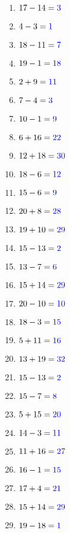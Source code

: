 \documentclass[11pt]{article}\usepackage[a4paper,margin=0.90in,tmargin=0.5in]{geometry}\usepackage{amsmath, amsthm, amssymb}
\begin{document}
\vspace{0.5\baselineskip}\begin{multicols}{4}
\begin{enumerate}[itemsep=0.45\baselineskip]
\item $17 - 14 = { \color[rgb]{0,0,1} 3 }$ 
\item $4 - 3 = { \color[rgb]{0,0,1} 1 }$ 
\item $18 - 11 = { \color[rgb]{0,0,1} 7 }$ 
\item $19 - 1 = { \color[rgb]{0,0,1} 18 }$ 
\item $2 + 9 = { \color[rgb]{0,0,1} 11 }$ 
\item $7 - 4 = { \color[rgb]{0,0,1} 3 }$ 
\item $10 - 1 = { \color[rgb]{0,0,1} 9 }$ 
\item $6 + 16 = { \color[rgb]{0,0,1} 22 }$ 
\item $12 + 18 = { \color[rgb]{0,0,1} 30 }$ 
\item $18 - 6 = { \color[rgb]{0,0,1} 12 }$ 
\item $15 - 6 = { \color[rgb]{0,0,1} 9 }$ 
\item $20 + 8 = { \color[rgb]{0,0,1} 28 }$ 
\item $19 + 10 = { \color[rgb]{0,0,1} 29 }$ 
\item $15 - 13 = { \color[rgb]{0,0,1} 2 }$ 
\item $13 - 7 = { \color[rgb]{0,0,1} 6 }$ 
\item $15 + 14 = { \color[rgb]{0,0,1} 29 }$ 
\item $20 - 10 = { \color[rgb]{0,0,1} 10 }$ 
\item $18 - 3 = { \color[rgb]{0,0,1} 15 }$ 
\item $5 + 11 = { \color[rgb]{0,0,1} 16 }$ 
\item $13 + 19 = { \color[rgb]{0,0,1} 32 }$ 
\item $15 - 13 = { \color[rgb]{0,0,1} 2 }$ 
\item $15 - 7 = { \color[rgb]{0,0,1} 8 }$ 
\item $5 + 15 = { \color[rgb]{0,0,1} 20 }$ 
\item $14 - 3 = { \color[rgb]{0,0,1} 11 }$ 
\item $11 + 16 = { \color[rgb]{0,0,1} 27 }$ 
\item $16 - 1 = { \color[rgb]{0,0,1} 15 }$ 
\item $17 + 4 = { \color[rgb]{0,0,1} 21 }$ 
\item $15 + 14 = { \color[rgb]{0,0,1} 29 }$ 
\item $19 - 18 = { \color[rgb]{0,0,1} 1 }$ 

\end{enumerate}
\end{multicols}
\end{document}
